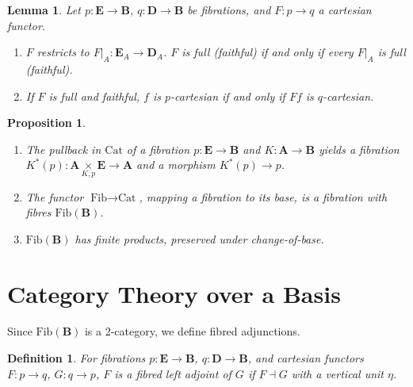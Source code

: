 \documentclass{article}
\theoremstyle{plain}
\newtheorem{lemma}[theorem]{Lemma}
\newtheorem{proposition}[theorem]{Proposition}
\newtheorem{definition}[theorem]{Definition}
\theoremstyle{remark}
\begin{document}
\begin{lemma}
\label{lem:2.5}
Let $p : \mathbf{E} \to \mathbf{B}$, $q : \mathbf{D} \to \mathbf{B}$ be fibrations, and $F : p \to q$ a cartesian functor.
\begin{enumerate}
    \item[(i)] $F$ restricts to $\left.F\right|_A : \mathbf{E}_A \to \mathbf{D}_A$. $F$ is full (faithful) if and only if every $\left.F\right|_A$ is full (faithful).
    \item[(ii)] If $F$ is full and faithful, $f$ is $p$-cartesian if and only if $F f$ is $q$-cartesian.
\end{enumerate}
\end{lemma}

\begin{proposition}
\label{prop:2.6}
\begin{enumerate}
    \item[(i)] The pullback in $\text{Cat}$ of a fibration $p : \mathbf{E} \to \mathbf{B}$ and $K : \mathbf{A} \to \mathbf{B}$ yields a fibration $K^*(p) : \mathbf{A} \underset{K, p}{\times} \mathbf{E} \to \mathbf{A}$ and a morphism $K^*(p) \to p$.
    \item[(ii)] The functor $\text{Fib} \to \text{Cat}$, mapping a fibration to its base, is a fibration with fibres $\text{Fib}(\mathbf{B})$.
    \item[(iii)] $\text{Fib}(\mathbf{B})$ has finite products, preserved under change-of-base.
\end{enumerate}
\end{proposition}

\section{Category Theory over a Basis}
\label{sec:category-theory-basis}

Since $\text{Fib}(\mathbf{B})$ is a 2-category, we define fibred adjunctions.

\begin{definition}
\label{def:3.1}
For fibrations $p : \mathbf{E} \to \mathbf{B}$, $q : \mathbf{D} \to \mathbf{B}$, and cartesian functors $F : p \to q$, $G : q \to p$, $F$ is a \emph{fibred left adjoint} of $G$ if $F \dashv G$ with a vertical unit $\eta$.
\end{definition}
\end{document}
